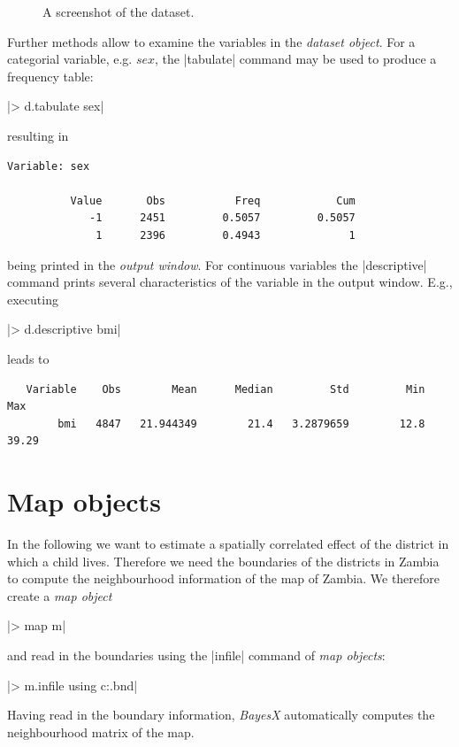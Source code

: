 \documentclass[a4paper]{article}
\begin{document}
\begin{figure}[ht]
\begin{center}
 {\it\caption{A
screenshot of the dataset.\label{screenshot}}}
\end{center}
\end{figure}

Further methods allow to examine the variables in the {\it dataset object}. For a categorial variable, e.g. $sex$, the
|tabulate| command may be used to produce a frequency table:

|> d.tabulate sex|

resulting in

\begin{verbatim}
Variable: sex

          Value       Obs           Freq            Cum
             -1      2451         0.5057         0.5057
              1      2396         0.4943              1
\end{verbatim}

being printed in the {\it output window}. For continuous variables the |descriptive| command prints several characteristics of
the variable in the {output window}. E.g., executing

|> d.descriptive bmi|

leads to

\begin{verbatim}
   Variable    Obs        Mean      Median         Std         Min         Max
        bmi   4847   21.944349        21.4   3.2879659        12.8       39.29
\end{verbatim}

\section{Map objects}\label{maps}

In the following we want to estimate a spatially correlated effect
of the district in which a child lives. Therefore we need the
boundaries of the districts in Zambia to compute the neighbourhood
information of the map of Zambia. We therefore create a {\it map
object}

|> map m|

and read in the boundaries using the |infile| command of {\it map objects}:

|> m.infile using c:\data\zambia.bnd|

Having read in the boundary information, {\it BayesX}
automatically computes the neighbourhood matrix of the map.
\end{document}
